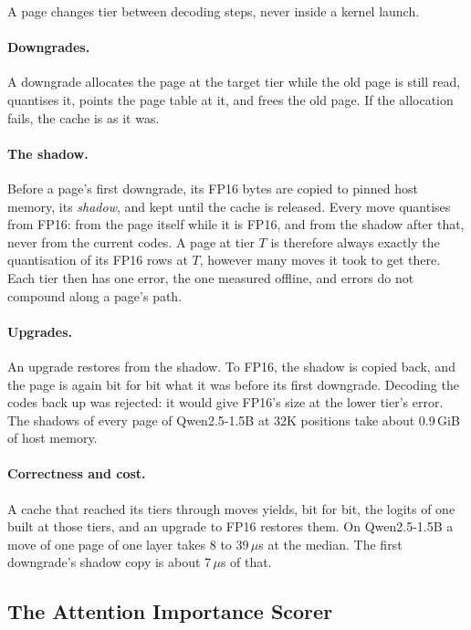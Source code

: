 \documentclass[11pt]{article}
\begin{document}
A page changes tier between decoding steps, never inside a kernel launch.

\paragraph{Downgrades.} A downgrade allocates the page at the target tier while
the old page is still read, quantises it, points the page table at it, and frees
the old page. If the allocation fails, the cache is as it was.

\paragraph{The shadow.} Before a page's first downgrade, its FP16 bytes are
copied to pinned host memory, its \textit{shadow}, and kept until the cache is
released.
Every move quantises from FP16: from the page itself while it is FP16, and from
the shadow after that, never from the current codes. A page at tier $T$ is
therefore always exactly the quantisation of its FP16 rows at $T$, however many
moves it took to get there. Each tier then has one error, the one measured
offline, and errors do not compound along a page's path.

\paragraph{Upgrades.} An upgrade restores from the shadow. To FP16, the shadow
is copied back, and the page is again bit for bit what it was before its first
downgrade. Decoding the codes back up was rejected: it would give FP16's size at
the lower tier's error. The shadows of every page of Qwen2.5-1.5B at 32K
positions take about 0.9\,GiB of host memory.

\paragraph{Correctness and cost.} A cache that reached its tiers through moves
yields, bit for bit, the logits of one built at those tiers, and an upgrade to
FP16 restores them. On Qwen2.5-1.5B a move of one page of one layer takes 8 to
39\,$\mu$s at the median. The first downgrade's shadow copy is about 7\,$\mu$s
of that.

\subsection{The Attention Importance Scorer}
\label{sec:scorer}
\end{document}
